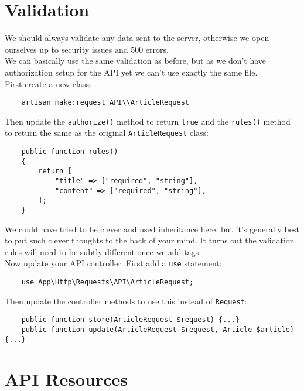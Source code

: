 \section{Validation}

We should always validate any data sent to the server, otherwise we open ourselves up to security issues and 500 errors.
\\

We can basically use the same validation as before, but as we don't have authorization setup for the API yet we can't use exactly the same file.
\\

First create a new class:

\begin{verbatim}
    artisan make:request API\\ArticleRequest
\end{verbatim}

Then update the \texttt{authorize()} method to return \texttt{true} and the \texttt{rules()} method to return the same as the original \texttt{ArticleRequest} class:

\begin{verbatim}
    public function rules()
    {
        return [
            "title" => ["required", "string"],
            "content" => ["required", "string"],
        ];
    }
\end{verbatim}

We could have tried to be clever and used inheritance here, but it's generally best to put such clever thoughts to the back of your mind. It turns out the validation rules will need to be subtly different once we add tags.
\\

Now update your API controller. First add a \texttt{use} statement:

\begin{verbatim}
    use App\Http\Requests\API\ArticleRequest;
\end{verbatim}

Then update the controller methods to use this instead of \texttt{Request}:

\begin{verbatim}
    public function store(ArticleRequest $request) {...}
    public function update(ArticleRequest $request, Article $article) {...}
\end{verbatim}


\section{API Resources}


